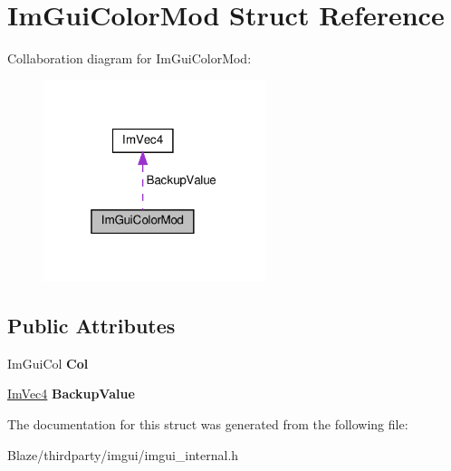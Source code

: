\hypertarget{structImGuiColorMod}{}\section{Im\+Gui\+Color\+Mod Struct Reference}
\label{structImGuiColorMod}


Collaboration diagram for Im\+Gui\+Color\+Mod\+:\nopagebreak
\begin{figure}[H]
\begin{center}
\leavevmode
\includegraphics[width=184pt]{structImGuiColorMod__coll__graph}
\end{center}
\end{figure}
\subsection*{Public Attributes}
\begin{DoxyCompactItemize}
\item 
\mbox{\label{structImGuiColorMod_a211171bd30d39348fc9b91289d253e1c}} 
Im\+Gui\+Col {\bfseries Col}
\item 
\mbox{\label{structImGuiColorMod_a99134f8cabbe0c2c45bf7d693bd6dae7}} 
\hyperlink{structImVec4}{Im\+Vec4} {\bfseries Backup\+Value}
\end{DoxyCompactItemize}


The documentation for this struct was generated from the following file\+:\begin{DoxyCompactItemize}
\item 
Blaze/thirdparty/imgui/imgui\+\_\+internal.\+h\end{DoxyCompactItemize}
